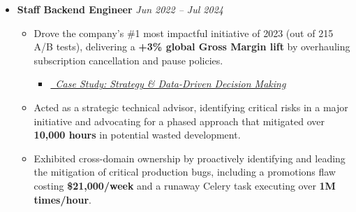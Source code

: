 \documentclass[a4paper,11pt]{article}
\newcommand{\resumeItem}[1]{
  \item\small{
    {#1 \vspace{-2pt}}
  }
}
\begin{document}
\begin{itemize}[leftmargin=*, topsep=4pt, partopsep=0pt, itemsep=8pt, parsep=0pt] %
    \item \textbf{Staff Backend Engineer} \hfill \textit{Jun 2022 – Jul 2024}
        \begin{itemize}[leftmargin=1.5em, topsep=2pt, itemsep=4pt]
                \item Drove the company's \#1 most impactful initiative of 2023 (out of 215 A/B tests), delivering a \textbf{+3\% global Gross Margin lift} by overhauling subscription cancellation and pause policies.
                \begin{itemize}[leftmargin=1.5em, topsep=0pt, itemsep=0pt, partopsep=0pt, parsep=0pt]
                    \item[] \href{https://www.isaacbernat.com/cv#casestudy-postpone-billing}{\textit{\small \faArrowCircleRight\ Case Study: Strategy \& Data-Driven Decision Making}}
                    \end{itemize}
                \item Acted as a strategic technical advisor, identifying critical risks in a major initiative and advocating for a phased approach that mitigated over \textbf{10,000 hours} in potential wasted development.
                \item Exhibited cross-domain ownership by proactively identifying and leading the mitigation of critical production bugs, including a promotions flaw costing \textbf{\$21,000/week} and a runaway Celery task executing over \textbf{1M times/hour}.
    
            \end{itemize}
        

\end{itemize}
\end{document}
